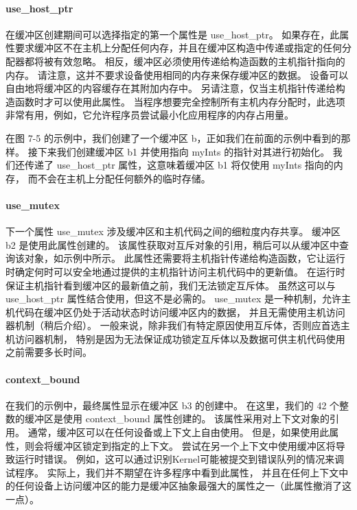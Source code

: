 \paragraph{use\_host\_ptr}

在缓冲区创建期间可以选择指定的第一个属性是 use\_host\_ptr。 
如果存在，此属性要求缓冲区不在主机上分配任何内存，并且在缓冲区构造中传递或指定的任何分配器都将被有效忽略。 
相反，缓冲区必须使用传递给构造函数的主机指针指向的内存。 请注意，这并不要求设备使用相同的内存来保存缓冲区的数据。 
设备可以自由地将缓冲区的内容缓存在其附加内存中。 另请注意，仅当主机指针传递给构造函数时才可以使用此属性。 
当程序想要完全控制所有主机内存分配时，此选项非常有用，例如，它允许程序员尝试最小化应用程序的内存占用量。

在图 7-5 的示例中，我们创建了一个缓冲区 b，正如我们在前面的示例中看到的那样。 
接下来我们创建缓冲区 b1 并使用指向 myInts 的指针对其进行初始化。 
我们还传递了 use\_host\_ptr 属性，这意味着缓冲区 b1 将仅使用 myInts 指向的内存，
而不会在主机上分配任何额外的临时存储。

\paragraph{use\_mutex}

下一个属性 use\_mutex 涉及缓冲区和主机代码之间的细粒度内存共享。 缓冲区 b2 是使用此属性创建的。 
该属性获取对互斥对象的引用，稍后可以从缓冲区中查询该对象，如示例中所示。 
此属性还需要将主机指针传递给构造函数，它让运行时确定何时可以安全地通过提供的主机指针访问主机代码中的更新值。 
在运行时保证主机指针看到缓冲区的最新值之前，我们无法锁定互斥体。 
虽然这可以与 use\_host\_ptr 属性结合使用，但这不是必需的。 
use\_mutex 是一种机制，允许主机代码在缓冲区仍处于活动状态时访问缓冲区内的数据，
并且无需使用主机访问器机制（稍后介绍）。 
一般来说，除非我们有特定原因使用互斥体，否则应首选主机访问器机制，
特别是因为无法保证成功锁定互斥体以及数据可供主机代码使用之前需要多长时间。

\paragraph{context\_bound}

在我们的示例中，最终属性显示在缓冲区 b3 的创建中。 
在这里，我们的 42 个整数的缓冲区是使用 context\_bound 属性创建的。 
该属性采用对上下文对象的引用。 通常，缓冲区可以在任何设备或上下文上自由使用。 
但是，如果使用此属性，则会将缓冲区锁定到指定的上下文。 尝试在另一个上下文中使用缓冲区将导致运行时错误。 
例如，这可以通过识别Kernel可能被提交到错误队列的情况来调试程序。 
实际上，我们并不期望在许多程序中看到此属性，
并且在任何上下文中的任何设备上访问缓冲区的能力是缓冲区抽象最强大的属性之一（此属性撤消了这一点）。

